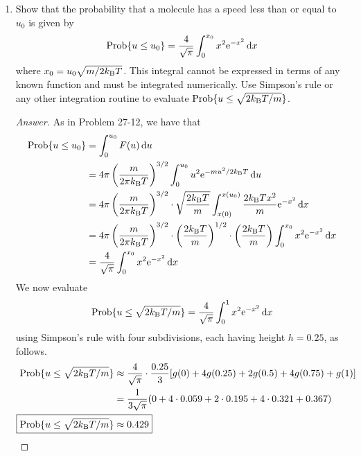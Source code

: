 \documentclass[../psets.tex]{subfiles}
\begin{document}
\begin{enumerate}[label={\textbf{27-\arabic*.}},leftmargin=3.5em]
\begin{proof}[Answer]
\begin{align*}
            \Aboxed{\sigma &= \SI{7.22e8}{\per\second}}
        \end{align*}
    \end{proof}
    \setcounter{enumi}{23}
    \item Show that the probability that a molecule has a speed less than or equal to $u_0$ is given by
    \begin{equation*}
        \Prob\{u\leq u_0\} = \frac{4}{\sqrt{\pi}}\int_0^{x_0}x^2\e[-x^2]\dd{x}
    \end{equation*}
    where $x_0=u_0\sqrt{m/2\kB T}$. This integral cannot be expressed in terms of any known function and must be integrated numerically. Use Simpson's rule or any other integration routine to evaluate $\Prob\{u\leq\sqrt{2\kB T/m}\}$.
    \begin{proof}[Answer]
        As in Problem 27-12, we have that
        \begin{align*}
            \Prob\{u\leq u_0\} &= \int_0^{u_0}F(u)\dd{u}\\
            &= 4\pi\left( \frac{m}{2\pi\kB T} \right)^{3/2}\int_0^{u_0}u^2\e[-mu^2/2\kB T]\dd{u}\\
            &= 4\pi\left( \frac{m}{2\pi\kB T} \right)^{3/2}\cdot\sqrt{\frac{2\kB T}{m}}\int_{x(0)}^{x(u_0)}\frac{2\kB Tx^2}{m}\e[-x^2]\dd{x}\\
            &= 4\pi\left( \frac{m}{2\pi\kB T} \right)^{3/2}\cdot\left( \frac{2\kB T}{m} \right)^{1/2}\cdot\left( \frac{2\kB T}{m} \right)\int_0^{x_0}x^2\e[-x^2]\dd{x}\\
            &= \frac{4}{\sqrt{\pi}}\int_0^{x_0}x^2\e[-x^2]\dd{x}
        \end{align*}
        We now evaluate
        \begin{equation*}
            \Prob\{u\leq\sqrt{2\kB T/m}\} = \frac{4}{\sqrt{\pi}}\int_0^1x^2\e[-x^2]\dd{x}
        \end{equation*}
        using Simpson's rule with four subdivisions, each having height $h=0.25$, as follows.
        \begin{align*}
            \Prob\{u\leq\sqrt{2\kB T/m}\} &\approx \frac{4}{\sqrt{\pi}}\cdot\frac{0.25}{3}[g(0)+4g(0.25)+2g(0.5)+4g(0.75)+g(1)]\\
            &= \frac{1}{3\sqrt{\pi}}(0+4\cdot 0.059+2\cdot 0.195+4\cdot 0.321+0.367)\\
            \Aboxed{\Prob\{u\leq\sqrt{2\kB T/m}\} &\approx 0.429}
        \end{align*}
    \end{proof}
    \setcounter{enumi}{26}

\end{enumerate}
\end{document}

